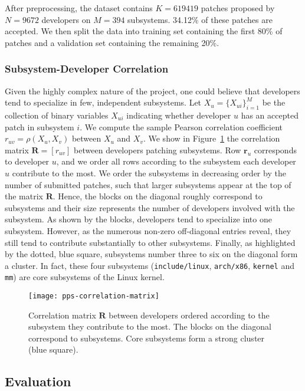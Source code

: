 After preprocessing, the dataset contains $K= \num{619419}$ patches proposed by $ N = \num{9672} $ developers on $M = \num{394}$ subsystems.
34.12\% of these patches are accepted.
We then split the data into training set containing the first 80\% of patches and a validation set containing the remaining 20\%.

\subsubsection{Subsystem-Developer Correlation}

Given the highly complex nature of the project, one could believe that developers tend to specialize in few, independent subsystems.
Let $X_u = \{ X_{ui} \}_{i=1}^M$ be the collection of binary variables $ X_{ui} $ indicating whether developer $u$ has an accepted patch in subsystem $i$.
We compute the sample Pearson correlation coefficient $r_{uv} = \rho(X_u, X_v)$ between $X_u$ and $X_v$.
We show in Figure~\ref{pps:fig:linux_correlation} the correlation matrix $ \bm{R} = [r_{uv}] $ between developers patching subsystems.
Row $\bm{r}_u$ corresponds to developer $u$, and we order all rows according to the subsystem each developer $u$ contribute to the most.
We order the subsystems in decreasing order by the number of submitted patches, such that larger subsystems appear at the top of the matrix $\bm{R}$.
Hence, the blocks on the diagonal roughly correspond to subsystems and their size represents the number of developers involved with the subsystem.
As shown by the blocks, developers tend to specialize into one subsystem.
However, as the numerous non-zero off-diagonal entries reveal, they still tend to contribute substantially to other subsystems.
Finally, as highlighted by the dotted, blue square, subsystems number three to six on the diagonal form a cluster.
In fact, these four subsystems (\texttt{include/linux}, \texttt{arch/x86}, \texttt{kernel} and \texttt{mm}) are core subsystems of the Linux kernel.

\begin{figure}
	\centering
	\texttt{[image: pps-correlation-matrix]}
	\caption{Correlation matrix $ \bm{R} $ between developers ordered according to the subsystem they contribute to the most. The blocks on the diagonal correspond to subsystems.
		Core subsystems form a strong cluster (blue square).}
	\label{pps:fig:linux_correlation}
\end{figure}

\subsection{Evaluation}

